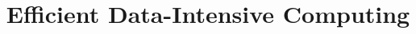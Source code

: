 \documentclass{acm_proc_article-sp}
\begin{document}
\title{Efficient Data-Intensive Computing}
%
%
%
%
%
\end{document}
